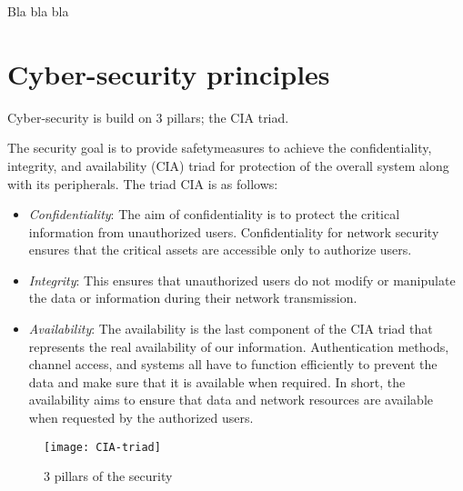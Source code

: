 Bla bla bla


\section {Cyber-security principles}
\medskip
{\Huge C}yber-security is build on 3 pillars; the CIA triad.


The security goal is to provide safetymeasures to achieve the confidentiality, integrity, and availability (CIA) triad for protection of the overall system along with its peripherals. The triad CIA is as follows:
\begin{itemize}
    \setlength\itemsep{1em}
    \item \emph{Confidentiality}: The aim of confidentiality is to protect the critical information from unauthorized users. Confidentiality for network security ensures that the critical assets are accessible only to authorize users.
    \item \emph{Integrity}: This ensures that unauthorized users do not modify or manipulate the data or information during their network transmission.
    \item \emph{Availability}: The availability is the last component of the CIA triad that represents the real availability of our information. Authentication methods, channel access, and systems all have to function efficiently to prevent the data and make sure that it is available when required. In short, the availability aims to ensure that data and network resources are available when requested by the authorized users.    
\end{itemize}

\FloatBarrier
\begin{figure}[ht]
	\centering
    \texttt{[image: CIA-triad]}
    \caption{3 pillars of the security}
    \label{fig:CIA}
\end{figure}
\FloatBarrier

